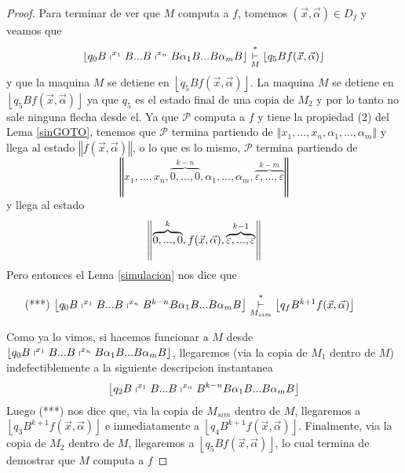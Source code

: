 \begin{frame}
\begin{proof}
  Para terminar de ver que $M$ computa a $f$, tomemos $(\vec{x},\vec{\alpha}%
  )\in D_{f}$ y veamos que%
  \begin{equation*}
  \left\lfloor q_{0}B\shortmid ^{x_{1}}B...B\shortmid ^{x_{n}}B\alpha
  _{1}B...B\alpha _{m}B\right\rfloor \overset{\ast }{\underset{M}{\vdash }}%
  \left\lfloor q_{5}Bf(\vec{x},\vec{\alpha})\right\rfloor
  \end{equation*}%
  y que la maquina $M$ se detiene en $\left\lfloor q_{5}Bf(\vec{x},\vec{\alpha}%
  )\right\rfloor $. La maquina $M$ se detiene en $\left\lfloor q_{5}Bf(\vec{x},%
  \vec{\alpha})\right\rfloor $ ya que $q_{5}$ es el estado final de una copia
  de $M_{2}$ y por lo tanto no sale ninguna flecha desde el. Ya que $\mathcal{P%
  }$ computa a $f$ y tiene la propiedad (2) del Lema \ref{sinGOTO}, tenemos
  que $\mathcal{P}$ termina partiendo de $\left\Vert x_{1},...,x_{n},\alpha
  _{1},...,\alpha _{m}\right\Vert $ y llega al estado $\left\Vert f(\vec{x},%
  \vec{\alpha})\right\Vert $, o lo que es lo mismo, $\mathcal{P}$ termina
  partiendo de%
  \begin{equation*}
  \left\Vert x_{1},...,x_{n},\overset{k-n}{\overbrace{0,...,0}},\alpha
  _{1},...,\alpha _{m},\overset{k-m}{\overbrace{\varepsilon ,...,\varepsilon }}%
  \right\Vert
  \end{equation*}%
  y llega al estado%
  \begin{equation*}
  \left\Vert \overset{k}{\overbrace{0,...,0}},f(\vec{x},\vec{\alpha}),\overset{%
  k-1}{\overbrace{\varepsilon ,...,\varepsilon }}\right\Vert
  \end{equation*}%
  Pero entonces el Lema \ref{simulacion} nos dice que

  \begin{enumerate}
  \item[(***)] $\left\lfloor q_{0}B\shortmid ^{x_{1}}B...B\shortmid
  ^{x_{n}}B^{k-n}B\alpha _{1}B...B\alpha _{m}B\right\rfloor \overset{\ast }{%
  \underset{M_{sim}}{\vdash }}\left\lfloor q_{f}B^{k+1}f(\vec{x},\vec{\alpha}%
  )\right\rfloor $
  \end{enumerate}

  Como ya lo vimos, si hacemos funcionar a $M$ desde $\left\lfloor
  q_{0}B\shortmid ^{x_{1}}B...B\shortmid ^{x_{n}}B\alpha _{1}B...B\alpha
  _{m}B\right\rfloor $, llegaremos (via la copia de $M_{1}$ dentro de $M$)
  indefectiblemente a la siguiente descripcion instantanea%
  \begin{equation*}
  \left\lfloor q_{2}B\shortmid ^{x_{1}}B...B\shortmid ^{x_{n}}B^{k-n}B\alpha
  _{1}B...B\alpha _{m}B\right\rfloor
  \end{equation*}%
  Luego (***) nos dice que, via la copia de $M_{sim}$ dentro de $M$,
  llegaremos a $\left\lfloor q_{3}B^{k+1}f(\vec{x},\vec{\alpha})\right\rfloor $
  e inmediatamente a $\left\lfloor q_{4}B^{k+1}f(\vec{x},\vec{\alpha}%
  )\right\rfloor $. Finalmente, via la copia de $M_{2}$ dentro de $M$,
  llegaremos a $\left\lfloor q_{5}Bf(\vec{x},\vec{\alpha})\right\rfloor $, lo
  cual termina de demostrar que $M$ computa a $f$
  \end{proof}
\end{frame}
